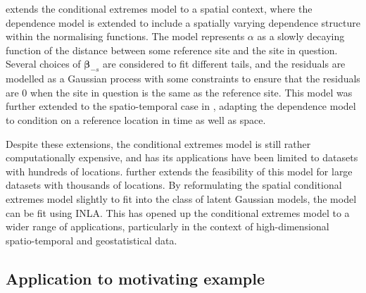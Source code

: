 \documentclass{article}
\numberwithin{equation}{section}
\begin{document}
\cite{Wadsworth2018} extends the conditional extremes model to a spatial context, where the dependence model is extended to include a spatially varying dependence structure within the normalising functions. 
The model represents $\alpha$ as a slowly decaying function of the distance between some reference site and the site in question.
Several choices of $\bm{\beta}_{-s}$ are considered to fit different tails, and the residuals are modelled as a Gaussian process with some constraints to ensure that the residuals are 0 when the site in question is the same as the reference site.
This model was further extended to the spatio-temporal case in \citet{Simpson2021}, adapting the dependence model to condition on a reference location in time as well as space. 

Despite these extensions, the conditional extremes model is still rather computationally expensive, and has its applications have been limited to datasets with hundreds of locations.
\cite{Simpson2023} further extends the feasibility of this model for large datasets with thousands of locations. 
By reformulating the spatial conditional extremes model slightly to fit into the class of latent Gaussian models, the model can be fit using INLA.
This has opened up the conditional extremes model to a wider range of applications, particularly in the context of high-dimensional spatio-temporal and geostatistical data.

\subsection{Application to motivating example}
\end{document}
